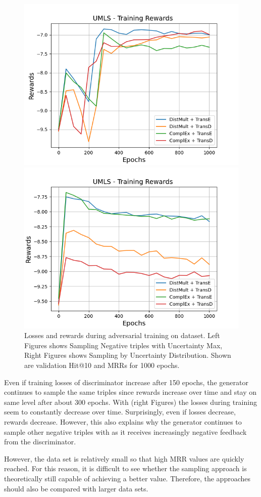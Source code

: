 \begin{figure}
\begin{minipage}{.5\textwidth}
      \includegraphics[width=0.9\linewidth]{figures/results/gan_train/not_pretrained/uncertainty/max/entropy/umls/uncertainty_umls_rew.png}
    \end{minipage}%
    \begin{minipage}{.5\textwidth}
      \centering
      \includegraphics[width=0.9\linewidth]{figures/results/gan_train/not_pretrained/uncertainty/max_distribution/entropy/umls/uncertainty_umls_rew.png}
    \end{minipage}%
    \caption{Losses and rewards during adversarial training on \umls dataset. 
    Left Figures shows Sampling Negative triples with Uncertainty Max, Right Figures shows Sampling by Uncertainty Distribution.
    Shown are validation Hit@10 and MRRs for 1000 epochs.}
    \label{fig:advtrain_umls_usmax_ussoftmax_losses_rewards}
\end{figure}
Even if training losses of discriminator increase after 150 epochs, the generator continues to sample the same triples since rewards increase over time and stay on same level after about 300 epochs.
With \ussoftmax (right Figures) the losses during training seem to constantly decrease over time.
Surprisingly, even if losses decrease, rewards decrease.
However, this also explains why the generator continues to sample other negative triples with \ussoftmax as it receives increasingly negative feedback from the discriminator.

However, the \umls data set is relatively small so that high MRR values are quickly reached.
For this reason, it is difficult to see whether the sampling approach is theoretically still capable of achieving a better value.
Therefore, the approaches should also be compared with larger data sets.


